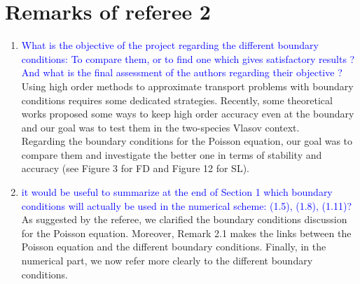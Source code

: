 \documentclass{article}
\begin{document}
\section{Remarks of referee 2}

\begin{enumerate}
    \item \textcolor{blue}{What is the objective of the project regarding the different boundary conditions:
To compare them, or to find one which gives satisfactory results ?
And what is the final assessment of the authors regarding their objective ? }\\ 
Using high order methods to approximate transport problems with boundary conditions requires some dedicated strategies. 
Recently, some theoretical works proposed some ways to keep high order accuracy even at the boundary and our goal 
was to test them in the two-species Vlasov context. \\
Regarding the boundary conditions for the Poisson equation, our goal was to compare them and investigate the better one 
in terms of stability and accuracy (see Figure 3 for FD and Figure 12 for SL). 
        \item \textcolor{blue}{it would be useful to summarize at the end of Section 1 which boundary conditions will actually be used in the numerical scheme: (1.5), (1.8), (1.11)? }\\
        As suggested by the referee, we clarified the boundary conditions discussion for the Poisson equation. Moreover, Remark 2.1 
        makes the links between the Poisson equation and the different boundary conditions. Finally, in the numerical part, we now refer more clearly 
        to the different boundary conditions. 

\end{enumerate}
\end{document}
